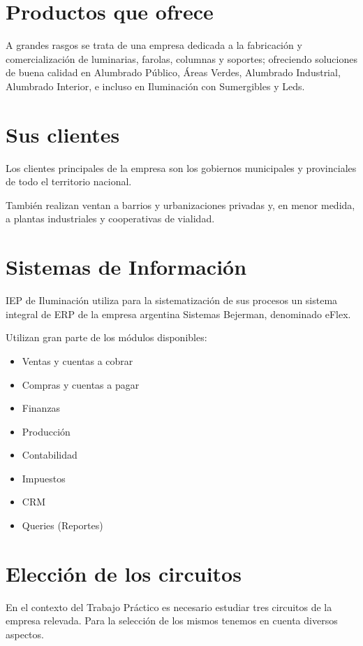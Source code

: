 \documentclass[12pt,titlepage]{article}
\begin{document}
\section{Productos que ofrece}
A grandes rasgos se trata de una empresa dedicada a la fabricaci\'on y comercializaci\'on de luminarias, farolas, columnas y soportes; ofreciendo soluciones de buena calidad en Alumbrado P\'ublico, \'Areas Verdes, Alumbrado Industrial, Alumbrado Interior, e incluso en Iluminaci\'on con Sumergibles y Leds.

\section{Sus clientes}
Los clientes principales de la empresa son los gobiernos municipales y provinciales de todo el territorio nacional.

Tambi\'en realizan ventan a barrios y urbanizaciones privadas y, en menor medida, a plantas industriales y cooperativas de vialidad.

\section{Sistemas de Informaci\'on}

IEP de Iluminaci\'on utiliza para la sistematizaci\'on de sus procesos un sistema integral de ERP de la empresa argentina Sistemas Bejerman, denominado eFlex.

Utilizan gran parte de los m\'odulos disponibles:

\begin{itemize}
\item Ventas y cuentas a cobrar
\item Compras y cuentas a pagar
\item Finanzas
\item Producci\'on
\item Contabilidad
\item Impuestos
\item CRM
\item Queries (Reportes)
\end{itemize}

\section{Elecci\'on de los circuitos}

En el contexto del Trabajo Pr\'actico es necesario estudiar tres circuitos de la empresa relevada. Para la selecci\'on de los mismos tenemos en cuenta diversos aspectos.
\end{document}
